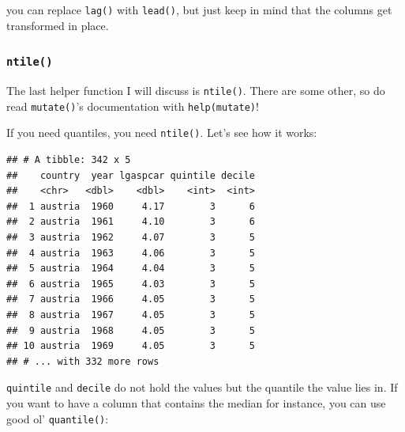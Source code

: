\documentclass[]{gitbook}
\newenvironment{Shaded}{\begin{snugshade}}{\end{snugshade}}
\newcommand{\CommentTok}[1]{\textcolor[rgb]{0.56,0.35,0.01}{\textit{#1}}}
\newcommand{\DataTypeTok}[1]{\textcolor[rgb]{0.13,0.29,0.53}{#1}}
\newcommand{\DecValTok}[1]{\textcolor[rgb]{0.00,0.00,0.81}{#1}}
\newcommand{\FloatTok}[1]{\textcolor[rgb]{0.00,0.00,0.81}{#1}}
\newcommand{\KeywordTok}[1]{\textcolor[rgb]{0.13,0.29,0.53}{\textbf{#1}}}
\newcommand{\NormalTok}[1]{#1}
\newcommand{\OperatorTok}[1]{\textcolor[rgb]{0.81,0.36,0.00}{\textbf{#1}}}
\newcommand{\StringTok}[1]{\textcolor[rgb]{0.31,0.60,0.02}{#1}}
\theoremstyle{definition}
\theoremstyle{definition}
\theoremstyle{definition}
\theoremstyle{remark}
\begin{document}
you can replace \texttt{lag()} with \texttt{lead()}, but just keep in
mind that the columns get transformed in place.

\hypertarget{ntile}{%
\subsubsection{\texorpdfstring{\texttt{ntile()}}{ntile()}}\label{ntile}}

The last helper function I will discuss is \texttt{ntile()}. There are
some other, so do read \texttt{mutate()}'s documentation with
\texttt{help(mutate)}!

If you need quantiles, you need \texttt{ntile()}. Let's see how it
works:

\begin{Shaded}
\end{Shaded}

\begin{verbatim}
## # A tibble: 342 x 5
##    country  year lgaspcar quintile decile
##    <chr>   <dbl>    <dbl>    <int>  <int>
##  1 austria  1960     4.17        3      6
##  2 austria  1961     4.10        3      6
##  3 austria  1962     4.07        3      5
##  4 austria  1963     4.06        3      5
##  5 austria  1964     4.04        3      5
##  6 austria  1965     4.03        3      5
##  7 austria  1966     4.05        3      5
##  8 austria  1967     4.05        3      5
##  9 austria  1968     4.05        3      5
## 10 austria  1969     4.05        3      5
## # ... with 332 more rows
\end{verbatim}

\texttt{quintile} and \texttt{decile} do not hold the values but the
quantile the value lies in. If you want to have a column that contains
the median for instance, you can use good ol' \texttt{quantile()}:

\begin{Shaded}
\end{Shaded}
\end{document}
